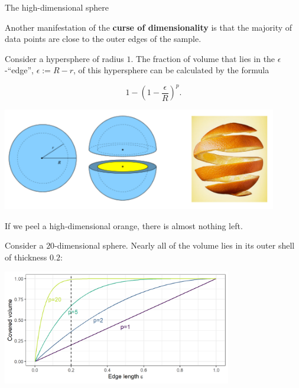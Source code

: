 \begin{vbframe}{The high-dimensional sphere}


Another manifestation of the \textbf{curse of dimensionality} is that the majority of data points are close to the outer edges of the sample.
 

Consider a hypersphere of radius $1$. The fraction of volume that lies in the $\epsilon$-\enquote{edge}, $\epsilon := R - r$, of this hypersphere can be calculated by the formula

\vspace*{-0.7cm}

$$
1-\left(1-\frac{\epsilon}{R}\right)^p.
$$

\vspace*{-0.5cm}

\begin{center}
\includegraphics[width=0.9\textwidth]{figure_man/orange.png}
\end{center}

\vspace*{-0.5cm}

If we peel a high-dimensional orange, there is almost nothing left. 

\flushleft


\framebreak

Consider a $20$-dimensional sphere. Nearly all of the volume lies in its outer shell of thickness $0.2$:
\medskip

\vspace*{0.1cm}
\begin{center}
\includegraphics[width = 10cm ]{figure/cursed_dim_fraction_edge_plot.png}
\end{center}

\end{vbframe}

